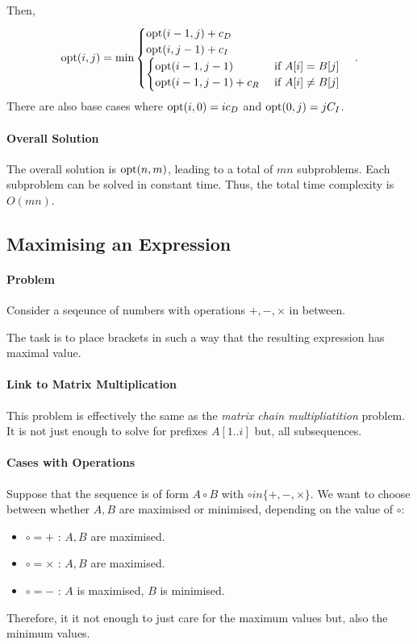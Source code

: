 Then, \[
  \mathrm{opt}(i, j) = \min \begin{cases}
    \mathrm{opt}(i - 1, j) + c_D \\
    \mathrm{opt}(i, j - 1) + c_I \\
    \begin{cases}
      \mathrm{opt}(i - 1, j - 1)        & \text{ if } A[i] = B[j] \\
      \mathrm{opt}(i - 1, j - 1) + c_R  & \text{ if } A[i] \neq B[j] \\
    \end{cases}
  \end{cases}
.\] 
There are also base cases where \(\mathrm{opt}(i, 0) = ic_D\) and  \(\mathrm{opt}(0, j) = jC_I\). 

\paragraph{Overall Solution}
The overall solution is \(\mathrm{opt}(n, m)\), leading to a total of \(mn\)
subproblems. Each subproblem can be solved in constant time. Thus, the total time complexity
is \(O(mn)\).

\subsection{Maximising an Expression}

\paragraph{Problem}
Consider a seqeunce of numbers with operations \(+, -, \times\) in between.

The task is to place brackets in such a way that the resulting expression
has maximal value.

\paragraph{Link to Matrix Multiplication}
This problem is effectively the same as the \textit{matrix chain multipliatition} problem.
It is not just enough to solve for prefixes \(A[1..i]\) but, all subsequences.

\paragraph{Cases with Operations}
Suppose that the sequence is of form \(A \circ B\) with  \(\circ in \{+, -, \times\} \).
We want to choose between whether \(A, B\) are maximised or minimised,
depending on the value of \(\circ\):
\begin{itemize}
  \item \(\circ = +\) : \(A, B\) are maximised.
  \item \(\circ = \times\) : \(A, B\) are maximised.
  \item \(\circ = -\) : \(A\) is  maximised,  \(B\) is minimised.
\end{itemize}
Therefore, it it not enough to just care for the maximum values but, also
the minimum values.

